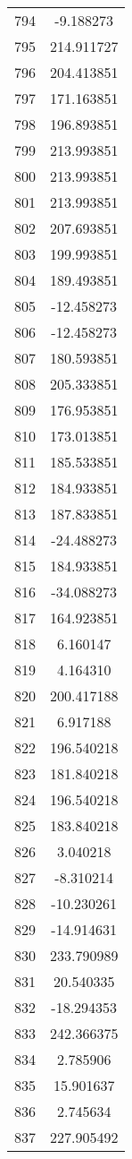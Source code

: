 \documentclass[12pt]{article}
\begin{document}
\begin{longtable}{@{}cc@{}}
794 & -9.188273 \\
795 & 214.911727 \\
796 & 204.413851 \\
797 & 171.163851 \\
798 & 196.893851 \\
799 & 213.993851 \\
800 & 213.993851 \\
801 & 213.993851 \\
802 & 207.693851 \\
803 & 199.993851 \\
804 & 189.493851 \\
805 & -12.458273 \\
806 & -12.458273 \\
807 & 180.593851 \\
808 & 205.333851 \\
809 & 176.953851 \\
810 & 173.013851 \\
811 & 185.533851 \\
812 & 184.933851 \\
813 & 187.833851 \\
814 & -24.488273 \\
815 & 184.933851 \\
816 & -34.088273 \\
817 & 164.923851 \\
818 & 6.160147 \\
819 & 4.164310 \\
820 & 200.417188 \\
821 & 6.917188 \\
822 & 196.540218 \\
823 & 181.840218 \\
824 & 196.540218 \\
825 & 183.840218 \\
826 & 3.040218 \\
827 & -8.310214 \\
828 & -10.230261 \\
829 & -14.914631 \\
830 & 233.790989 \\
831 & 20.540335 \\
832 & -18.294353 \\
833 & 242.366375 \\
834 & 2.785906 \\
835 & 15.901637 \\
836 & 2.745634 \\
837 & 227.905492 \\

\end{longtable}
\end{document}
